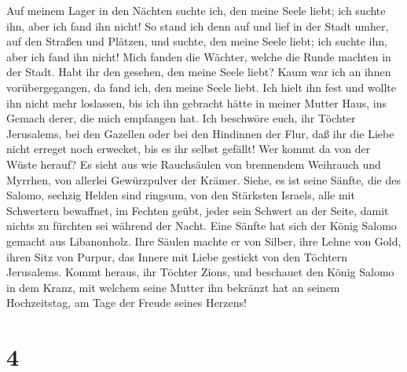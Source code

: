  Auf meinem Lager in den Nächten suchte ich, den meine
Seele liebt; ich suchte ihn, aber ich fand ihn nicht!  So
stand ich denn auf und lief in der Stadt umher, auf den Straßen und
Plätzen, und suchte, den meine Seele liebt; ich suchte ihn, aber ich
fand ihn nicht!  Mich fanden die Wächter, welche die Runde
machten in der Stadt. Habt ihr den gesehen, den meine Seele liebt?
 Kaum war ich an ihnen vorübergegangen, da fand ich, den
meine Seele liebt. Ich hielt ihn fest und wollte ihn nicht mehr
loslassen, bis ich ihn gebracht hätte in meiner Mutter Haus, ins Gemach
derer, die mich empfangen hat.  Ich beschwöre euch, ihr
Töchter Jerusalems, bei den Gazellen oder bei den Hindinnen der Flur,
daß ihr die Liebe nicht erreget noch erwecket, bis es ihr selbst
gefällt!  Wer kommt da von der Wüste herauf? Es sieht aus
wie Rauchsäulen von brennendem Weihrauch und Myrrhen, von allerlei
Gewürzpulver der Krämer.  Siehe, es ist seine Sänfte, die
des Salomo, sechzig Helden sind ringsum, von den Stärksten Israels,
 alle mit Schwertern bewaffnet, im Fechten geübt, jeder
sein Schwert an der Seite, damit nichts zu fürchten sei während der
Nacht.  Eine Sänfte hat sich der König Salomo gemacht aus
Libanonholz.  Ihre Säulen machte er von Silber, ihre
Lehne von Gold, ihren Sitz von Purpur, das Innere mit Liebe gestickt von
den Töchtern Jerusalems.  Kommt heraus, ihr Töchter
Zions, und beschauet den König Salomo in dem Kranz, mit welchem seine
Mutter ihn bekränzt hat an seinem Hochzeitstag, am Tage der Freude
seines Herzens!

\hypertarget{section-3}{%
\section{4}\label{section-3}}

